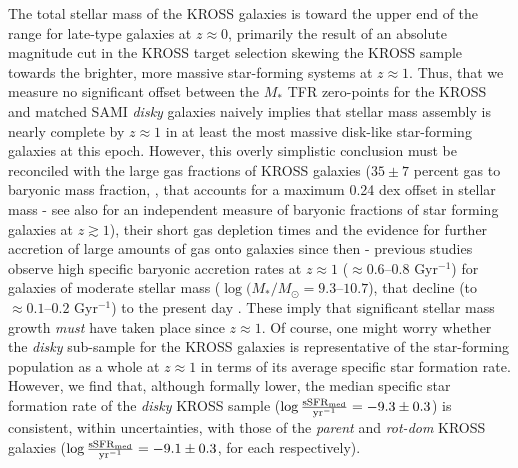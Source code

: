 \documentclass[a4paper,fleqn,usenatbib]{mnras}
\begin{document}
{The total stellar mass of the KROSS galaxies is toward the upper end of the range for late-type galaxies at $z\approx0$, primarily the result of an absolute magnitude cut in the KROSS target selection skewing the KROSS sample towards the brighter, more massive star-forming systems at $z\approx1$. Thus, that we measure no significant offset between the $M_{*}$ TFR zero-points for the KROSS and matched SAMI \textit{disky} galaxies naively implies that stellar mass assembly is nearly complete by $z\approx1$ in at least the most massive disk-like star-forming galaxies at this epoch. However, this overly simplistic conclusion must be reconciled with the large gas fractions of KROSS galaxies ($35\pm7$ percent gas to baryonic mass fraction, \citealt{Stott:2016}, that accounts for a maximum 0.24 dex offset in stellar mass - see also \citealt{Wuyts:2016} for an independent measure of baryonic fractions of star forming galaxies at $z\gtrsim 1$), their short gas depletion times and the evidence for further accretion of large amounts of gas onto galaxies since then - previous studies observe high specific baryonic accretion rates at $z\approx1$ ($\approx 0.6$--$0.8$ Gyr$^{-1}$) for galaxies of moderate stellar mass ($\log(M_{*}/M_{\odot} = 9.3$--$10.7$), that decline (to $\approx0.1$--$0.2$ Gyr$^{-1}$) to the present day \citep{Elbaz:2007,Salim:2007,Dutton:2010}. These imply that significant stellar mass growth {\em must} have taken place since $z\approx1$. Of course, one might worry whether the \textit{disky} sub-sample for the KROSS galaxies is representative of the star-forming population as a whole at $z\approx1$ in terms of its average specific star formation rate. However, we find that, although formally lower, the median specific star formation rate of the \textit{disky} KROSS sample ($\log \frac{\rm{sSFR}_{\rm{med}}}{\rm{yr}^{-1}}=-9.3 \pm 0.3$) is consistent, within uncertainties, with those of the \textit{parent} and \textit{rot-dom} KROSS galaxies ($\log \frac{\rm{sSFR}_{\rm{med}}}{\rm{yr}^{-1}}=-9.1 \pm 0.3$, for each respectively). 

}
\end{document}
